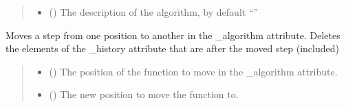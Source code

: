 \documentclass[letterpaper,10pt,english]{sphinxmanual}
\begin{document}
\begin{fulllineitems}
\begin{fulllineitems}
\begin{quote}
\begin{description}
\begin{itemize}
\item {} 
\sphinxAtStartPar
{} (\sphinxstyleliteralemphasis{\sphinxupquote{, }}) \textendash{} The description of the algorithm, by default “”

\end{itemize}

\end{description}\end{quote}

\end{fulllineitems}


\begin{fulllineitems}
\label{\detokenize{source/_autosummary/HDF5_BLS_analyse.Analyse_backend:HDF5_BLS_analyse.Analyse_backend.silent_move_step}}
\pysigstartsignatures
\pysiglinewithargsret
{}
{\sphinxparamcomma {}}
{}
\pysigstopsignatures
\sphinxAtStartPar
Moves a step from one position to another in the \_algorithm attribute. Deletes the elements of the \_history attribute that are after the moved step (included)
\begin{quote}\begin{description}
\begin{itemize}
\item {} 
\sphinxAtStartPar
{} () \textendash{} The position of the function to move in the \_algorithm attribute.

\item {} 
\sphinxAtStartPar
{} () \textendash{} The new position to move the function to.

\end{itemize}

\end{description}\end{quote}

\end{fulllineitems}


\end{fulllineitems}
\end{document}
